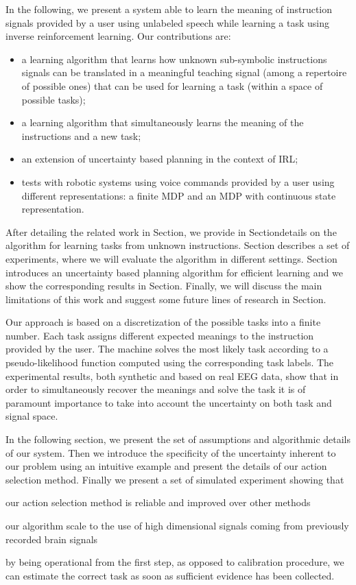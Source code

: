 In the following, we present a system able to learn the meaning of instruction signals provided by a user using unlabeled speech while learning a task using inverse reinforcement learning. Our contributions are:
\begin{itemize}
    \item a learning algorithm that learns how unknown sub-symbolic instructions signals can be translated in a meaningful teaching signal (among a repertoire of possible ones) that can be used for learning a task (within a space of possible tasks);
    \item a learning algorithm that simultaneously learns the meaning of the instructions and a new task;
    \item an extension of uncertainty based planning in the context of IRL;
    \item tests with robotic systems using voice commands provided by a user using different representations: a finite MDP and an MDP with continuous state representation.
\end{itemize}

After detailing the related work in Section, we provide in Sectiondetails on the algorithm for learning tasks from unknown instructions. Section describes a set of experiments, where we will evaluate the algorithm in different settings. Section introduces an uncertainty based planning algorithm for efficient learning and we show the corresponding results in Section. Finally, we will discuss the main limitations of this work and suggest some future lines of research in Section. 


Our approach is based on a discretization of the possible tasks into a finite number. Each task assigns different expected meanings to the instruction provided by the user. The machine solves the most likely task according to a pseudo-likelihood function computed using the corresponding task labels. The experimental results, both synthetic and based on real EEG data, show that in order to simultaneously recover the meanings and solve the task it is of paramount importance to take into account the uncertainty on both task and signal space.

In the following section, we present the set of assumptions and algorithmic details of our system. Then we introduce the specificity of the uncertainty inherent to our problem using an intuitive example and present the details of our action selection method. Finally we present a set of simulated experiment showing that 
\begin{inparaenum}[a)]
\item our action selection method is reliable and improved over other methods
\item our algorithm scale to the use of high dimensional signals coming from previously recorded brain signals
\item by being operational from the first step, as opposed to calibration procedure, we can estimate the correct task as soon as sufficient evidence has been collected.
\end{inparaenum}

